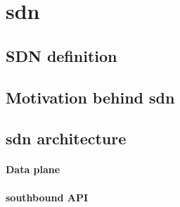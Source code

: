 
%

\chapter[Software Defined Networking]{\acrlong{sdn}} %
\label{cha:sdn}




\section{SDN definition}


\section[Motivation behind SDN]{Motivation behind \gls{sdn}}



\section[SDN architecture]{\gls{sdn} architecture} %

\subsubsection{Data plane} %


\subsubsection{southbound API} %

   
